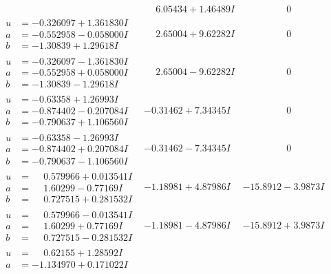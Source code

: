 \documentclass[1p]{elsarticle_modified}
\theoremstyle{definition}
\begin{document}
$$\begin{array}{c|c|c}
 & \phantom{-}6.05434 + 1.46489 I & \phantom{-0.000000 } 0 \\ \hline\begin{aligned}
u &= -0.326097 + 1.361830 I \\
a &= -0.552958 - 0.058000 I \\
b &= -1.30839 + 1.29618 I\end{aligned}
 & \phantom{-}2.65004 + 9.62282 I & \phantom{-0.000000 } 0 \\ \hline\begin{aligned}
u &= -0.326097 - 1.361830 I \\
a &= -0.552958 + 0.058000 I \\
b &= -1.30839 - 1.29618 I\end{aligned}
 & \phantom{-}2.65004 - 9.62282 I & \phantom{-0.000000 } 0 \\ \hline\begin{aligned}
u &= -0.63358 + 1.26993 I \\
a &= -0.874402 - 0.207084 I \\
b &= -0.790637 + 1.106560 I\end{aligned}
 & -0.31462 + 7.34345 I & \phantom{-0.000000 } 0 \\ \hline\begin{aligned}
u &= -0.63358 - 1.26993 I \\
a &= -0.874402 + 0.207084 I \\
b &= -0.790637 - 1.106560 I\end{aligned}
 & -0.31462 - 7.34345 I & \phantom{-0.000000 } 0 \\ \hline\begin{aligned}
u &= \phantom{-}0.579966 + 0.013541 I \\
a &= \phantom{-}1.60299 - 0.77169 I \\
b &= \phantom{-}0.727515 + 0.281532 I\end{aligned}
 & -1.18981 + 4.87986 I & -15.8912 - 3.9873 I \\ \hline\begin{aligned}
u &= \phantom{-}0.579966 - 0.013541 I \\
a &= \phantom{-}1.60299 + 0.77169 I \\
b &= \phantom{-}0.727515 - 0.281532 I\end{aligned}
 & -1.18981 - 4.87986 I & -15.8912 + 3.9873 I \\ \hline\begin{aligned}
u &= \phantom{-}0.62155 + 1.28592 I \\
a &= -1.134970 + 0.171022 I \\

\end{aligned}
\end{array}$$
\end{document}

